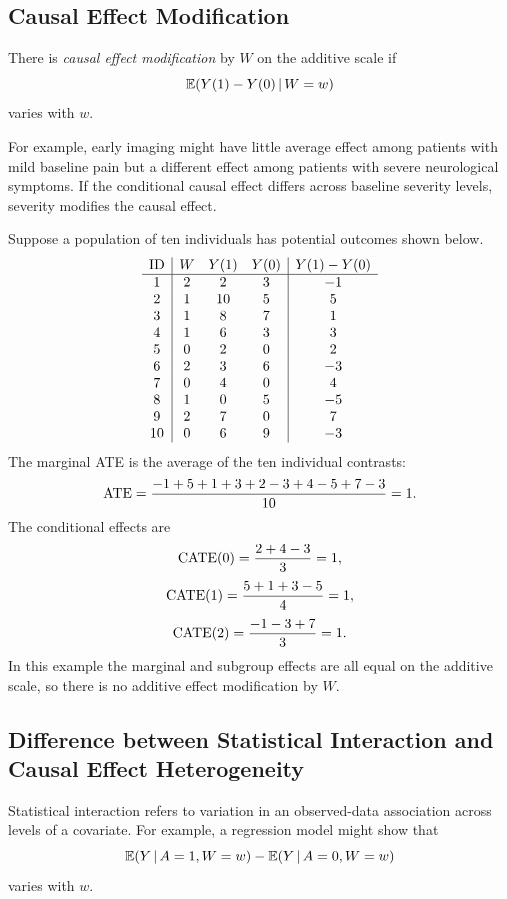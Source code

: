 \subsection{Causal Effect Modification}

\begin{definition}
There is \emph{causal effect modification} by $W$ on the additive scale if
\[
\mathbb{E}(Y(1)-Y(0)\,\vert\, W=w)
\]
varies with $w$.
\end{definition}

For example, early imaging might have little average effect among patients with mild baseline pain but a different effect among patients with severe neurological symptoms. If the conditional causal effect differs across baseline severity levels, severity modifies the causal effect.

\begin{example}
Suppose a population of ten individuals has potential outcomes shown below.
\[
\begin{array}{c|ccc|c}
\text{ID} & W & Y(1) & Y(0) & Y(1)-Y(0)\\
\hline
1 & 2 & 2 & 3 & -1\\
2 & 1 & 10 & 5 & 5\\
3 & 1 & 8 & 7 & 1\\
4 & 1 & 6 & 3 & 3\\
5 & 0 & 2 & 0 & 2\\
6 & 2 & 3 & 6 & -3\\
7 & 0 & 4 & 0 & 4\\
8 & 1 & 0 & 5 & -5\\
9 & 2 & 7 & 0 & 7\\
10 & 0 & 6 & 9 & -3
\end{array}
\]
The marginal ATE is the average of the ten individual contrasts:
\[
\operatorname{ATE}=\frac{-1+5+1+3+2-3+4-5+7-3}{10}=1.
\]
The conditional effects are
\[
\operatorname{CATE}(0)=\frac{2+4-3}{3}=1,
\]
\[
\operatorname{CATE}(1)=\frac{5+1+3-5}{4}=1,
\]
\[
\operatorname{CATE}(2)=\frac{-1-3+7}{3}=1.
\]
In this example the marginal and subgroup effects are all equal on the additive scale, so there is no additive effect modification by $W$.
\end{example}

\subsection{Difference between Statistical Interaction and Causal Effect Heterogeneity}

Statistical interaction refers to variation in an observed-data association across levels of a covariate. For example, a regression model might show that
\[
\mathbb{E}(Y\,\vert\, A=1,W=w)-\mathbb{E}(Y\,\vert\, A=0,W=w)
\]
varies with $w$.

